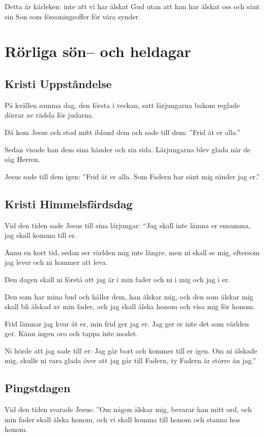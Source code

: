 Detta är kärleken: inte att vi har älskat Gud utan att han har älskat oss och sänt sin Son som försoningsoffer för våra synder.

\newpage

\section{Rörliga sön-- och heldagar}


\subsection{Kristi Uppståndelse}

{På kvällen samma dag, den första i veckan, satt lärjungarna bakom reglade dörrar av rädsla för judarna.}

 Då kom Jesus och stod mitt ibland dem och sade till dem: ''Frid åt er alla.'' 

Sedan visade han dem sina händer och sin sida. Lärjungarna blev glada när de såg Herren. 

Jesus sade till dem igen: ''Frid åt er alla. Som Fadern har sänt mig sänder jag er.'' 


\subsection{Kristi Himmelsfärdsdag}
{Vid den tiden sade Jesus till sina lärjungar:} ``Jag skall inte lämna er ensamma, jag skall komma till er. 

Ännu en kort tid, sedan ser världen mig inte längre, men ni skall se mig, eftersom jag lever och ni kommer att leva. 

Den dagen skall ni förstå att jag är i min fader och ni i mig och jag i er. 

Den som har mina bud och håller dem, han älskar mig, och den som älskar mig skall bli älskad av min fader, och jag skall älska honom och visa mig för honom.

Frid lämnar jag kvar åt er, min frid ger jag er. Jag ger er inte det som världen ger. Känn ingen oro och tappa inte modet. 

Ni hörde att jag sade till er: Jag går bort och kommer till er igen. Om ni älskade mig, skulle ni vara glada över att jag går till Fadern, ty Fadern är större än jag.''


\subsection{Pingstdagen}
{Vid den tiden svarade Jesus:} ''Om någon älskar mig, bevarar han mitt ord, och min fader skall älska honom, och vi skall komma till honom och stanna hos honom. 

